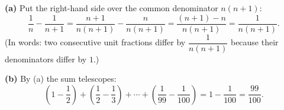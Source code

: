 \textbf{(a)} Put the right-hand side over the common denominator $n(n+1)$:
\[\dfrac{1}{n}-\dfrac{1}{n+1}=\dfrac{n+1}{n(n+1)}-\dfrac{n}{n(n+1)}=\dfrac{(n+1)-n}{n(n+1)}=\dfrac{1}{n(n+1)}.\]
(In words: two consecutive unit fractions differ by $\dfrac{1}{n(n+1)}$ because their denominators differ by $1$.)

\textbf{(b)} By (a) the sum telescopes:
\[\left(1-\dfrac{1}{2}\right)+\left(\dfrac{1}{2}-\dfrac{1}{3}\right)+\cdots+\left(\dfrac{1}{99}-\dfrac{1}{100}\right)=1-\dfrac{1}{100}=\boxed{\dfrac{99}{100}}.\]
